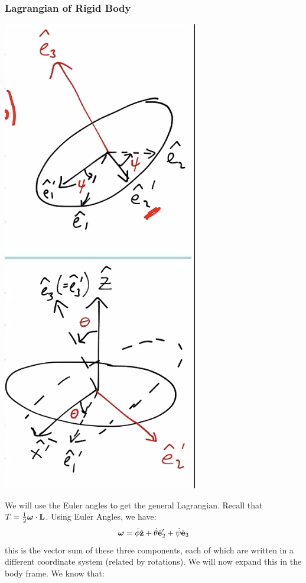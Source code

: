 \subsubsection{Lagrangian of Rigid Body}
\begin{center}
    \includegraphics[scale=0.5]{Lecture-21/l21-img1.png}
\end{center}
We will use the Euler angles to get the general Lagrangian. Recall that $T = \frac{1}{2}\bm{\omega}\cdot\mathbf{L}$. Using Euler Angles, we have:
\[\bm{\omega} = \dot{\phi}\hat{\mathbf{z}} + \dot{\theta}\hat{\mathbf{e}}_2' + \dot{\psi}\hat{\mathbf{e}}_3\]
this is the vector sum of these three components, each of which are written in a different coordinate system (related by rotations). We will now expand this in the body frame. We know that:
